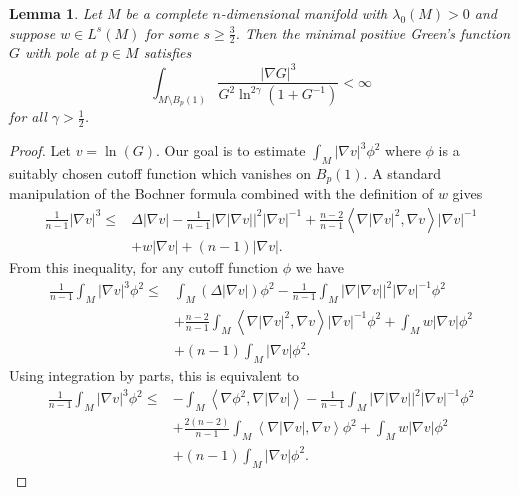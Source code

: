 \documentclass{amsart}
\newtheorem{lemma}[theorem]{Lemma}
\theoremstyle{definition}
\theoremstyle{remark}
\numberwithin{equation}{section}
\begin{document}
\begin{lemma}
    Let $M$ be a complete $n$-dimensional manifold with $\lambda_0(M)>0$ and suppose $w\in L^s(M)$ for some $s\geq \frac{3}{2}$. Then the minimal positive Green's function $G$ with pole at $p\in M$ satisfies
    \begin{equation*}
    \int_{M\setminus B_p(1)} \frac{|\nabla G|^3}{G^2\ln^{2\gamma}(1+G^{-1})}<\infty
    \end{equation*}
    for all $\gamma > \frac{1}{2}$.
\end{lemma}

\begin{proof}

   Let $v = \ln(G)$. Our goal is to estimate $\int_M |\nabla v|^3\phi^2$ where $\phi$ is a suitably chosen cutoff function which vanishes on $B_p(1)$. A standard manipulation of the Bochner formula combined with the definition of $w$ gives 
\begin{align*}
\frac{1}{n-1}|\nabla v|^3\leq& \Delta |\nabla v|-\frac{1}{n-1}|\nabla |\nabla v||^2|\nabla v|^{-1}+\frac{n-2}{n-1}\left<\nabla |\nabla v|^2,\nabla v\right>|\nabla v|^{-1}\\
&+w|\nabla v|+(n-1)|\nabla v|.
\end{align*}
From this inequality, for any cutoff function $\phi$ we have
\begin{align*}
\frac{1}{n-1}\int_M |\nabla v|^3\phi^2 \leq &\int_M (\Delta |\nabla v|)\phi^2 - \frac{1}{n-1}\int_M |\nabla |\nabla v||^2|\nabla v|^{-1}\phi^2\\
&+\frac{n-2}{n-1}\int_M\left<\nabla |\nabla v|^2,\nabla v\right>|\nabla v|^{-1}\phi^2+\int_M w|\nabla v|\phi^2\\
&+(n-1)\int_M |\nabla v|\phi^2. 
\end{align*}
Using integration by parts, this is equivalent to
\begin{align*}
\frac{1}{n-1}\int_M |\nabla v|^3\phi^2\leq &-\int_M \left<\nabla \phi^2,\nabla |\nabla v|\right>- \frac{1}{n-1}\int_M |\nabla |\nabla v||^2|\nabla v|^{-1}\phi^2 \\
&+\frac{2(n-2)}{n-1}\int_M\left<\nabla |\nabla v|,\nabla v\right>\phi^2 +\int_M w|\nabla v|\phi^2\\
&+(n-1)\int_M|\nabla v|\phi^2.
\end{align*}


\end{proof}
\end{document}
